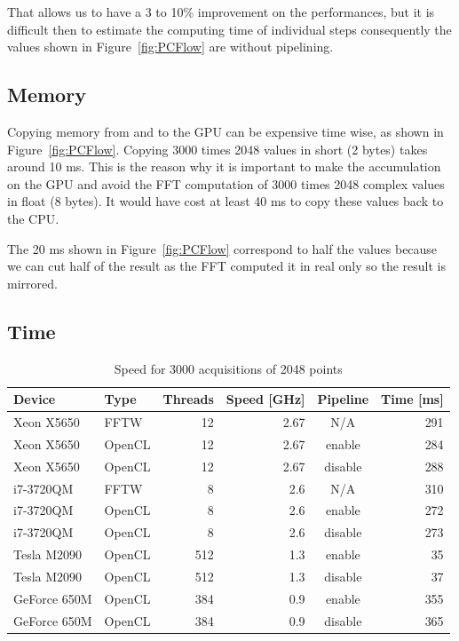    That allows us to have a 3 to 10\% improvement on the performances, but it is difficult then to estimate the computing time of individual steps consequently the values shown in Figure~\ref{fig:PCFlow} are without pipelining.

   \subsection{Memory}

   Copying memory from and to the \gls{GPU} can be expensive time wise, as shown in Figure~\ref{fig:PCFlow}. Copying 3000 times 2048 values in short (2 bytes) takes around 10 ms. This is the reason why it is important to make the accumulation on the \gls{GPU} and avoid the \gls{FFT} computation of 3000 times 2048 complex values in float (8 bytes). It would have cost at least 40 ms to copy these values back to the \gls{CPU}. 

   The 20 ms shown in Figure~\ref{fig:PCFlow} correspond to half the values because we can cut half of the result as the \gls{FFT} computed it in real only so the result is mirrored.
	
   \subsection{Time}

	\begin{table}[H]
		\caption{Speed for 3000 acquisitions of 2048 points}
		\centering
		\label{tab:speed}
		\begin{tabular}{|l|lrrcr|}
			\hline
				Device & Type & Threads & Speed [GHz] & Pipeline & Time [ms] \\
			\hline
			\hline
				Xeon X5650 & FFTW & 12 & 2.67 & N/A & 291 \\
				Xeon X5650 & OpenCL & 12 & 2.67 & enable & 284 \\
				Xeon X5650 & OpenCL & 12 & 2.67 & disable & 288 \\
			\hline
				i7-3720QM & FFTW & 8 & 2.6 & N/A & 310 \\
				i7-3720QM & OpenCL & 8 & 2.6 & enable & 272 \\
				i7-3720QM & OpenCL & 8 & 2.6 & disable & 273 \\
			\hline
			\hline
				Tesla M2090 & OpenCL & 512 & 1.3 & enable & 35 \\
				Tesla M2090 & OpenCL & 512 & 1.3 & disable & 37 \\
			\hline
				GeForce 650M & OpenCL & 384 & 0.9 & enable & 355 \\
				GeForce 650M & OpenCL & 384 & 0.9 & disable & 365 \\
			\hline
		\end{tabular}
	\end{table}

